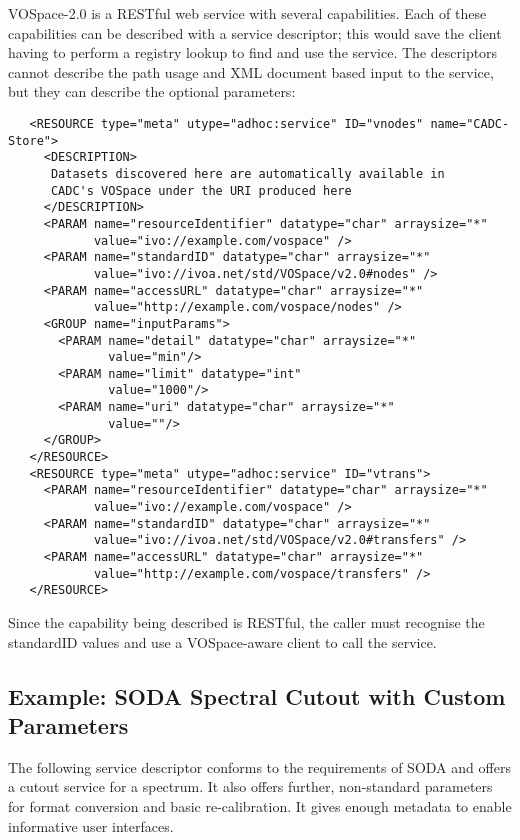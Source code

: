 \documentclass[11pt,a4paper]{ivoa}
\begin{document}
VOSpace-2.0 is a RESTful web service with several capabilities. Each of
these capabilities can be described with a service descriptor; this would
save the client having to perform a registry lookup to find and use the
service. The descriptors cannot describe the path usage and XML document
based input to the service, but they can describe the optional parameters:
\begin{verbatim}
   <RESOURCE type="meta" utype="adhoc:service" ID="vnodes" name="CADC-Store">
     <DESCRIPTION>
      Datasets discovered here are automatically available in 
      CADC's VOSpace under the URI produced here
     </DESCRIPTION>
     <PARAM name="resourceIdentifier" datatype="char" arraysize="*"
            value="ivo://example.com/vospace" />
     <PARAM name="standardID" datatype="char" arraysize="*"
            value="ivo://ivoa.net/std/VOSpace/v2.0#nodes" />
     <PARAM name="accessURL" datatype="char" arraysize="*"
            value="http://example.com/vospace/nodes" />
     <GROUP name="inputParams">
       <PARAM name="detail" datatype="char" arraysize="*"
              value="min"/>
       <PARAM name="limit" datatype="int"
              value="1000"/>
       <PARAM name="uri" datatype="char" arraysize="*"
              value=""/>
     </GROUP>
   </RESOURCE>
   <RESOURCE type="meta" utype="adhoc:service" ID="vtrans">
     <PARAM name="resourceIdentifier" datatype="char" arraysize="*"
            value="ivo://example.com/vospace" />
     <PARAM name="standardID" datatype="char" arraysize="*"
            value="ivo://ivoa.net/std/VOSpace/v2.0#transfers" />
     <PARAM name="accessURL" datatype="char" arraysize="*"
            value="http://example.com/vospace/transfers" />
   </RESOURCE>
\end{verbatim}
Since the capability being described is RESTful, the
caller must recognise the standardID values and use a VOSpace-aware
client to call the service.


\subsection{Example: SODA Spectral Cutout with Custom Parameters}

The following service descriptor conforms to the requirements of SODA
\citep{2017ivoa.spec.0517B} and offers a cutout service for a spectrum.
It also offers further, non-standard parameters for format conversion
and basic re-calibration.  It gives enough metadata to enable
informative user interfaces.
\end{document}

